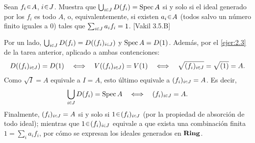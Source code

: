 \begin{ejer}\label{ejer:t3-cubierta-distinguidos}
Sean $f_i\en A$, $i\en J$. Muestra que $\bigcup_{i\en J}D(f_i)=\Spec A$ si y solo si el ideal generado por los $f_i$ es todo $A$, o, equivalentemente, si existen $a_i\en A$ (todos salvo un número finito iguales a $0$) tales que $\sum_{i\en J}a_i f_i=1$. \hfill [Vakil 3.5.B]
\end{ejer}
\begin{sol}
Por un lado, $\bigcup_{i\en J}D(f_i)=D((f_i)_{i\en J})$ y $\operatorname{Spec} A=D(1)$. Además, por el \cref{ejer:2.3} de la tarea anterior, aplicado a ambas contenciones:
\[
D((f_i)_{i\en J})=D(1)
\quad\Longleftrightarrow\quad V((f_i)_{i\en J})=V(1)
\quad\Longleftrightarrow\quad\sqrt{(f_i)_{i\en J}}=\sqrt{(1)}=A.
\]
Como $\sqrt I=A$ equivale a $I=A$, esto último equivale a $(f_i)_{i\en J}=A$. Es decir,
\[
\bigcup_{i\en J}D(f_i)=\Spec A
\quad\Longleftrightarrow\quad(f_i)_{i\en J}=A.
\]
Finalmente, $(f_i)_{i\en J}=A$ si y solo si $1\en(f_i)_{i\en J}$ (por la propiedad de absorción de todo ideal); mientras que $1\en(f_i)_{i\en J}$ equivale a que exista una combinación finita $1=\sum_i a_i f_i$, por cómo se expresan los ideales generados en $\mathbf{Ring}$.
\end{sol}
